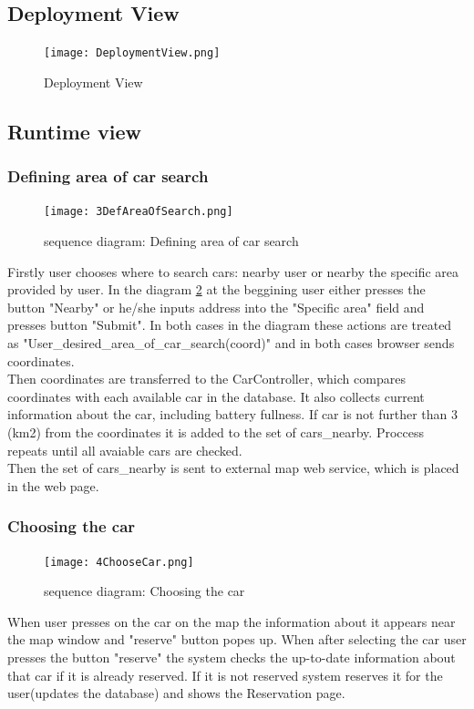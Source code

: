 \documentclass[12pt, letterpaper]{article}
\begin{document}
\subsection{Deployment View} 

\begin{figure}[H]
\centering
\texttt{[image: DeploymentView.png]} 
\caption{Deployment View}
\label{fig:DepView}
\end{figure}

\newpage
\subsection{Runtime view}
\subsubsection{Defining area of car search}
\begin{figure}[H]
\centering
\texttt{[image: 3DefAreaOfSearch.png]} 
\caption{sequence diagram: Defining area of car search}
\label{fig:3DefAreaOfSearch}
\end{figure}
\newpage
Firstly user chooses where to search cars: nearby user or nearby the specific area provided by user. In the diagram \ref{fig:3DefAreaOfSearch} at the beggining user either presses the button "Nearby" or he/she inputs address into the "Specific area" field and presses button "Submit". In both cases in the diagram these actions are treated as "User\_desired\_area\_of\_car\_search(coord)" and in both cases browser sends coordinates. \\
Then coordinates are transferred to the CarController, which compares coordinates with each available car in the database. It also collects current information about the car, including battery fullness.  If car is not further than 3 (km2) from the coordinates it is added to the set of cars\_nearby. Proccess repeats until all avaiable cars are checked. \\
Then the set of cars\_nearby is sent to external map web service, which is placed in the web page.  
\newpage
\subsubsection{Choosing the car}
\begin{figure}[H]
\centering
\texttt{[image: 4ChooseCar.png]} 
\caption{sequence diagram: Choosing the car}
\label{fig:4ChooseCar}
\end{figure}
\newpage
When user presses on the car on the map the information about it appears near the map window and "reserve" button popes up. When after selecting the car user presses the button "reserve" the system checks the up-to-date information about that car if it is already reserved. If it is not reserved system reserves it for the user(updates the database) and shows the Reservation page.  
\newpage
\end{document}
